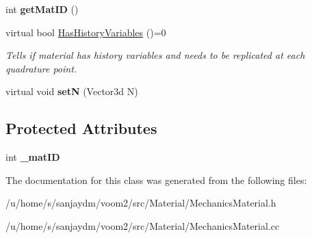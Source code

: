 \begin{DoxyCompactItemize}
\item 
\hypertarget{classvoom_1_1_mechanics_material_ac2337249b845f90695efdec24b61b4c8}{
int {\bfseries getMatID} ()}
\label{classvoom_1_1_mechanics_material_ac2337249b845f90695efdec24b61b4c8}

\item 
\hypertarget{classvoom_1_1_mechanics_material_a3c962d203b86f8ea092e8a754c01e2cb}{
virtual bool \hyperlink{classvoom_1_1_mechanics_material_a3c962d203b86f8ea092e8a754c01e2cb}{HasHistoryVariables} ()=0}
\label{classvoom_1_1_mechanics_material_a3c962d203b86f8ea092e8a754c01e2cb}

\begin{DoxyCompactList}\small\item\em Tells if material has history variables and needs to be replicated at each quadrature point. \item\end{DoxyCompactList}\item 
\hypertarget{classvoom_1_1_mechanics_material_adb51de2bd9887980035947d3edbdf18e}{
virtual void {\bfseries setN} (Vector3d N)}
\label{classvoom_1_1_mechanics_material_adb51de2bd9887980035947d3edbdf18e}

\end{DoxyCompactItemize}
\subsection*{Protected Attributes}
\begin{DoxyCompactItemize}
\item 
\hypertarget{classvoom_1_1_mechanics_material_a62ee931a1815b63a8e70cdf3c89ef680}{
int {\bfseries \_\-matID}}
\label{classvoom_1_1_mechanics_material_a62ee931a1815b63a8e70cdf3c89ef680}

\end{DoxyCompactItemize}


The documentation for this class was generated from the following files:\begin{DoxyCompactItemize}
\item 
/u/home/s/sanjaydm/voom2/src/Material/MechanicsMaterial.h\item 
/u/home/s/sanjaydm/voom2/src/Material/MechanicsMaterial.cc\end{DoxyCompactItemize}
